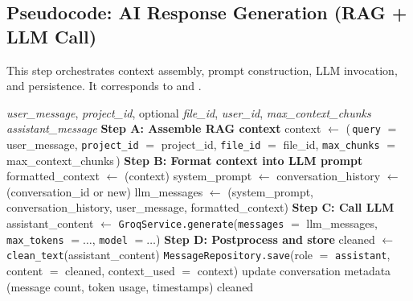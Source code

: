\subsection{Pseudocode: AI Response Generation (RAG + LLM Call)}

This step orchestrates context assembly, prompt construction, LLM invocation, and persistence. It corresponds to \texttt{} and \texttt{}.

\begin{algorithm}[H]
\caption{GenerateAIResponseWithContext}
\small\begin{algorithmic}[1]
\Require \textit{user\_message}, \textit{project\_id}, optional \textit{file\_id}, \textit{user\_id}, \textit{max\_context\_chunks}
\Ensure \textit{assistant\_message}
\State \textbf{Step A: Assemble RAG context}
\State context $\leftarrow$ \texttt{}(\,\texttt{query} $=$ user\_message,
\Statex \hspace{2em} \texttt{project\_id} $=$ project\_id, \texttt{file\_id} $=$ file\_id, \texttt{max\_chunks} $=$ max\_context\_chunks\,)
\State \textbf{Step B: Format context into LLM prompt}
\State formatted\_context $\leftarrow$ \texttt{}(context)
\State system\_prompt $\leftarrow$ \texttt{}
\State conversation\_history $\leftarrow$ \texttt{}(conversation\_id or new)
\State llm\_messages $\leftarrow$ \texttt{}(system\_prompt, conversation\_history,
\Statex \hspace{2em} user\_message, formatted\_context)
\State \textbf{Step C: Call LLM}
\State assistant\_content $\leftarrow$ \texttt{GroqService.generate}(\texttt{messages} $=$ llm\_messages,
\Statex \hspace{2em} \texttt{max\_tokens} $= \dots$, \texttt{model} $= \dots$)
\State \textbf{Step D: Postprocess and store}
\State cleaned $\leftarrow$ \texttt{clean\_text}(assistant\_content) 
\State \texttt{MessageRepository.save}(role $=$ \texttt{assistant}, content $=$ cleaned, context\_used $=$ context)
\State update conversation metadata (message count, token usage, timestamps)
\State \Return cleaned
\end{algorithmic}\normalsize
\end{algorithm}
\FloatBarrier

